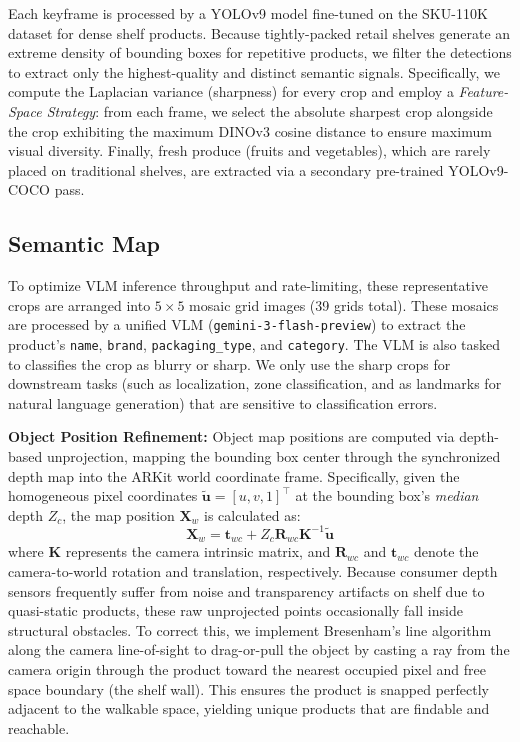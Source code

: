 \documentclass[sigconf,anonymous,review]{acmart}
\begin{document}
Each keyframe is processed by a YOLOv9 model fine-tuned on the SKU-110K dataset \cite{goldman2019dense} for dense shelf products. Because tightly-packed retail shelves generate an extreme density of bounding boxes for repetitive products, we filter the detections to extract only the highest-quality and distinct semantic signals. Specifically, we compute the Laplacian variance (sharpness) for every crop and employ a \emph{Feature-Space Strategy}: from each frame, we select the absolute sharpest crop alongside the crop exhibiting the maximum DINOv3 cosine distance to ensure maximum visual diversity. Finally, fresh produce (fruits and vegetables), which are rarely placed on traditional shelves, are extracted via a secondary pre-trained YOLOv9-COCO pass.

\subsection{Semantic Map}
\label{sec:semantic}
To optimize VLM inference throughput and rate-limiting, these representative crops are arranged into $5 \times 5$ mosaic grid images (39 grids total). These mosaics are processed by a unified VLM (\texttt{gemini-3-flash-preview}) to extract the product's \texttt{name}, \texttt{brand}, \texttt{packaging\_type}, and \texttt{category}. The VLM is also tasked to classifies the crop as blurry or sharp. We only use the sharp crops for downstream tasks (such as localization, zone classification, and as landmarks for natural language generation) that are sensitive to classification errors. 

\textbf{Object Position Refinement:} Object map positions are computed via depth-based unprojection, mapping the bounding box center through the synchronized depth map into the ARKit world coordinate frame. Specifically, given the homogeneous pixel coordinates $\tilde{\bm{u}} = [u, v, 1]^\top$ at the bounding box's \emph{median} depth $Z_c$, the map position $\bm{X}_w$ is calculated as:
\begin{equation}
\bm{X}_w = \bm{t}_{wc} + Z_c \bm{R}_{wc} \bm{K}^{-1} \tilde{\bm{u}}
\end{equation}
where $\bm{K}$ represents the camera intrinsic matrix, and $\bm{R}_{wc}$ and $\bm{t}_{wc}$ denote the camera-to-world rotation and translation, respectively.
Because consumer depth sensors frequently suffer from noise and transparency artifacts on shelf due to quasi-static products, these raw unprojected points occasionally fall inside structural obstacles. To correct this, we implement Bresenham’s line algorithm \cite{koopman1987bresenham} along the camera line-of-sight to drag-or-pull the object by casting a ray from the camera origin through the product toward the nearest occupied pixel and free space boundary (the shelf wall). This ensures the product is snapped perfectly adjacent to the walkable space, yielding unique products that are findable and reachable.
\end{document}
